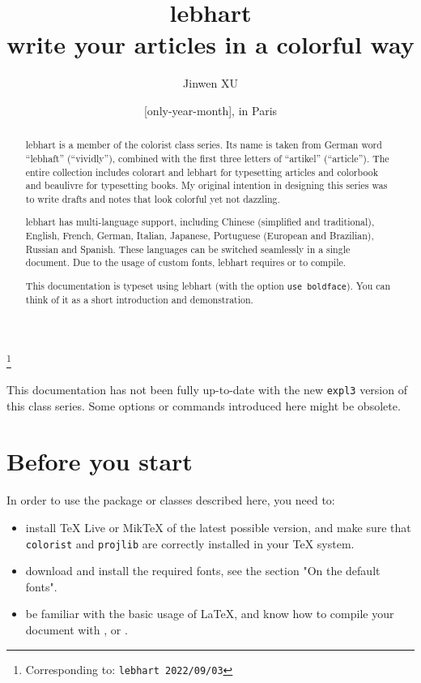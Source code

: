 \documentclass[title in boldface, title in scshape, simple name]{lebhart}
\newcommand{\classoption}[1]{\texttt{\textcolor{code-option}{#1}}}
\newenvironment{tip}[1][Tip]{%
    \begin{tcolorbox}[breakable,
        enhanced,
        width = \textwidth,
        colback = paper, colbacktitle = paper,
        colframe = gray!50, boxrule=0.2mm,
        coltitle = black,
        fonttitle = \sffamily,
        attach boxed title to top left = {yshift=-\tcboxedtitleheight/2, xshift=.5cm},
        boxed title style = {boxrule=0pt, colframe=paper},
        before skip = 0.3cm,
        after skip = 0.3cm,
        top = 3mm,
        bottom = 3mm,
        title={\scshape\sffamily #1}]%
}{\end{tcolorbox}}
\providecommand{\colorist}{\textsf{colorist}}
\providecommand{\colorart}{\textsf{colorart}}
\providecommand{\colorbook}{\textsf{colorbook}}
\providecommand{\lebhart}{\textsf{lebhart}}
\providecommand{\beaulivre}{\textsf{beaulivre}}
\let\LevelOneTitle\section
\begin{document}
\def\PackageVersion{2022/09/03}

\title{{\normalfont\bfseries\color{main-text}\lebhart{}}\\write your articles in a colorful way}
\author{Jinwen XU}
\thanks{Corresponding to: \texttt{\lebhart{} \PackageVersion}}
\date{\TheDate{\PackageVersion}[only-year-month], in Paris}

\maketitle

\begin{abstract}
    \lebhart{} is a member of the \colorist{} class series. Its name is taken from German word ``lebhaft'' (``vividly''), combined with the first three letters of ``artikel'' (``article''). The entire collection includes \colorart{} and \lebhart{} for typesetting articles and \colorbook{} and \beaulivre{} for typesetting books. My original intention in designing this series was to write drafts and notes that look colorful yet not dazzling.

    \lebhart{} has multi-language support, including Chinese (simplified and traditional), English, French, German, Italian, Japanese, Portuguese (European and Brazilian), Russian and Spanish. These languages can be switched seamlessly in a single document. Due to the usage of custom fonts, \lebhart{} requires  or  to compile.

    This documentation is typeset using \lebhart{} (with the option \classoption{use boldface}). You can think of it as a short introduction and demonstration.
\end{abstract}


\begin{tip}
    This documentation has not been fully up-to-date with the new \texttt{expl3} version of this class series. Some options or commands introduced here might be obsolete.
\end{tip}

\setcounter{tocdepth}{2}
\tableofcontents


\medskip
\LevelOneTitle*{Before you start}
In order to use the package or classes described here, you need to:
\begin{itemize}
    \item install TeX Live or MikTeX of the latest possible version, and make sure that \texttt{colorist} and \texttt{projlib} are correctly installed in your \TeX{} system.
    \item download and install the required fonts, see the section "On the default fonts".
    \item be familiar with the basic usage of \LaTeX{}, and know how to compile your document with ,  or .
\end{itemize}
\end{document}
